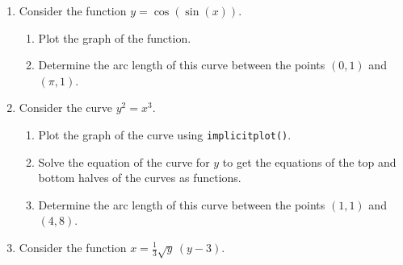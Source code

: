\begin{enumerate}
    \item Consider the function $y = \cos(\sin(x))$.
    \begin{enumerate}
        \item Plot the graph of the function.
        \item Determine the arc length of this curve between the points $(0,1)$ and $(\pi,1)$.
    \end{enumerate}
    \item Consider the curve $y^2 = x^3$.
    \begin{enumerate}
        \item Plot the graph of the curve using \texttt{implicitplot()}.
        \item Solve the equation of the curve for $y$ to get the equations of the top and bottom halves of the curves as functions.
        \item Determine the arc length of this curve between the points $(1,1)$ and $(4,8)$.
    \end{enumerate}
    \item Consider the function $x = \frac{1}{3}\sqrt{y}\,(y-3)$.
   

\end{enumerate}

